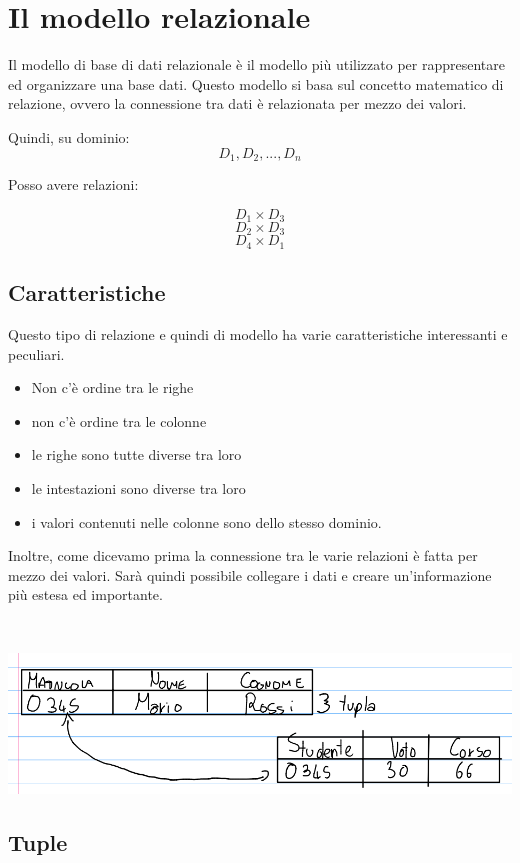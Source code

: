 \chapter{Il modello relazionale}

Il modello di base di dati relazionale è il modello più utilizzato per rappresentare ed organizzare una base dati. Questo modello si basa sul concetto matematico di relazione, ovvero la connessione tra dati è relazionata per mezzo dei valori.

Quindi, su dominio:
\[D_1, D_2, ..., D_n\]

Posso avere relazioni:

\[D_1  \times D_3\]
\[D_2  \times D_3\]
\[D_4 \times D_1\]

\section{Caratteristiche}
Questo tipo di relazione e quindi di modello ha varie caratteristiche interessanti e peculiari.

\begin{itemize}
    \item Non c'è ordine tra le righe
    \item non c'è ordine tra le colonne
    \item le righe sono tutte diverse tra loro
    \item le intestazioni sono diverse tra loro
    \item i valori contenuti nelle colonne sono dello stesso dominio.
\end{itemize}

Inoltre, come dicevamo prima la connessione tra le varie relazioni è fatta per mezzo dei valori. Sarà quindi possibile collegare i dati e creare un'informazione più estesa ed importante.


\begin{exmp}\

    \includegraphics[width=\textwidth]{img/con_tra_rel.png}
\end{exmp}


\section{Tuple}

